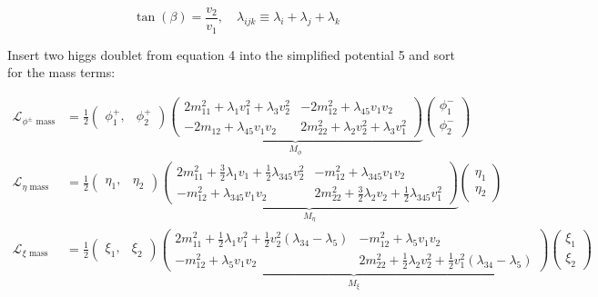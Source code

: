 \documentclass[12pt,oneside]{book}
\begin{document}
\begin{equation}
    \tan(\beta) = \frac{v_2}{v_1}, \quad \lambda_{ijk} \equiv \lambda_{i} + \lambda_{j} + \lambda_{k}
\end{equation}

Insert two higgs doublet from equation 4 into the simplified potential 5 and sort for the mass terms:

\begin{align}
    \mathcal{L}_{\phi^{\pm} \text{ mass}} &= \frac{1}{2}\begin{pmatrix} \phi^{+}_1, & \phi^{+}_2 \end{pmatrix} \underbrace{\begin{pmatrix} 2m_{11}^2 + \lambda_1 v_1^2 + \lambda_3 v_2^2 & -2m_{12}^2 + \lambda_{45}v_1 v_2 \\ -2m_{12} + \lambda_{45}v_1v_2 & 2m_{22}^2 + \lambda_2 v_2^2 + \lambda_3 v_1^2 \end{pmatrix}}_{M_\phi} \begin{pmatrix} \phi^{-}_1 \\ \phi^{-}_2 \end{pmatrix} \\
    \mathcal{L}_{\eta \text{ mass}} &= \frac{1}{2}\begin{pmatrix} \eta_1, & \eta_2 \end{pmatrix} \underbrace{\begin{pmatrix} 2m_{11}^{2} + \frac{3}{2}\lambda_1v_1 + \frac{1}{2}\lambda_{345}v_2^2 & -m_{12}^2 + \lambda_{345}v_1v_2 \\ -m_{12}^2 + \lambda_{345}v_1v_2 & 2m_{22}^{2} + \frac{3}{2}\lambda_2v_2 + \frac{1}{2}\lambda_{345}v_1^2\end{pmatrix}}_{M_\eta} \begin{pmatrix} \eta_1 \\ \eta_2 \end{pmatrix} \nonumber \\
    \mathcal{L}_{\xi \text{ mass}} &= \frac{1}{2}\begin{pmatrix} \xi_1, & \xi_2 \end{pmatrix} \underbrace{\begin{pmatrix} 2m_{11}^{2} + \frac{1}{2} \lambda_1v_1^2 + \frac{1}{2}v_2^2(\lambda_{34} - \lambda_5) & -m_{12}^2 + \lambda_5v_1v_2 \\ -m_{12}^2 + \lambda_5v_1v_2 & 2m_{22}^{2} + \frac{1}{2} \lambda_2v_2^2 + \frac{1}{2}v_1^2(\lambda_{34} - \lambda_5) \end{pmatrix}}_{M_\xi} \begin{pmatrix} \xi_1 \\ \xi_2 \end{pmatrix} \nonumber
\end{align}
\end{document}
